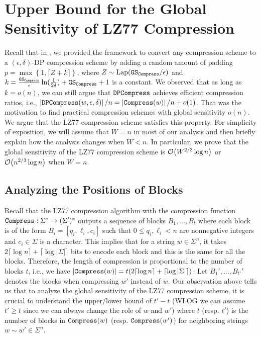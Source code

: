 \section{Upper Bound for the Global Sensitivity of LZ77 Compression}

Recall that in , we provided the framework to convert any compression scheme to a $(\epsilon,\delta)$-DP compression scheme by adding a random amount of padding $p=\max\left\{1, \lceil Z+k\rceil \right\}$, where $Z\sim\mathrm{Lap}(\mathtt{GS}_{\mathtt{Compress}}/\epsilon)$ and $k=\frac{\mathtt{GS}_{\mathtt{Compress}}}{\epsilon}\ln(\frac{1}{2\delta})+\mathtt{GS}_{\mathtt{Compress}} +1$ is a constant. We observed that as long as $k=o(n)$, we can still argue that $\mathtt{DPCompress}$ achieves efficient compression ratios, i.e., $\left| \mathtt{DPCompress}(w,\epsilon,\delta) \right|/ n = \left| \mathtt{Compress}(w) \right|/ n + o(1)$. That was the motivation to find practical compression schemes with global sensitivity $o(n)$. We argue that the LZ77 compression scheme \cite{LZ77} satisfies this property. For simplicity of exposition, we will assume that $W=n$ in most of our analysis and then briefly explain how the analysis changes when $W < n$. In particular, we prove that the global sensitivity of the LZ77 compression scheme is $\O{W^{2/3}\log n}$ or $\O{n^{2/3}\log n}$ when $W=n$.

\subsection{Analyzing the Positions of Blocks}

Recall that the LZ77 compression algorithm \cite{LZ77} with the compression function $\mathtt{Compress}:\Sigma^*\rightarrow(\Sigma')^*$ outputs a sequence of blocks $B_1,\ldots,B_t$ where each block is of the form $B_i=[q_i,\ell_i,c_i]$ such that $0\leq q_i,\ell_i< n$ are nonnegative integers and $c_i\in\Sigma$ is a character. This implies that for a string $w\in\Sigma^n$, it takes $2\lceil\log n\rceil + \lceil\log|\Sigma|\rceil$ bits to encode each block and this is the same for all the blocks. Therefore, the length of compression is proportional to the number of blocks $t$, i.e., we have $|\mathtt{Compress}(w)| = t(2\lceil\log n\rceil + \lceil\log|\Sigma|\rceil)$. Let $B_1',\ldots, B_{t'}'$ denotes the blocks when compressing $w'$ instead of $w$. Our observation above tells us that to analyze the global sensitivity of the LZ77 compression scheme, it is crucial to understand the upper/lower bound of $t'-t$ (WLOG we can assume $t'\geq t$ since we can always change the role of $w$ and $w'$) where $t$ (resp. $t'$) is the number of blocks in $\mathtt{Compress}(w)$ (resp. $\mathtt{Compress}(w')$) for neighboring strings $w\sim w'\in\Sigma^n$.

